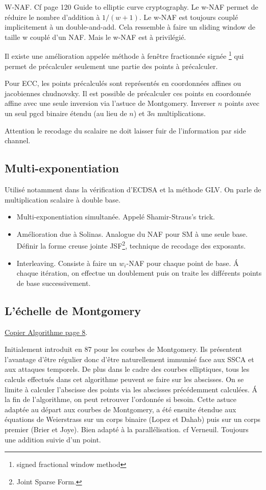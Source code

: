 W-NAF. Cf page 120 Guide to elliptic curve cryptography. Le w-NAF permet de réduire le nombre d'addition à $1/(w+1)$. Le w-NAF est toujours couplé implicitement à un double-and-add. Cela ressemble à faire un sliding window de taille w couplé d'un NAF. Mais le w-NAF est à privilégié.

Il existe une amélioration appelée méthode à fenêtre fractionnée signée \footnote{signed fractional window method} qui permet de précalculer seulement une partie des points à précalculer.

Pour ECC, les points précalculés sont représentés en coordonnées affines ou jacobiennes chudnovsky. Il est possible de précalculer ces points en coordonnée affine avec une seule inversion via l'astuce de Montgomery. Inverser $n$ points avec un seul pgcd binaire étendu (au lieu de $n$) et $3n$ multiplications.

Attention le recodage du scalaire ne doit laisser fuir de l'information par side channel.

\subsection{Multi-exponentiation}
Utilisé notamment dans la vérification d'ECDSA et la méthode GLV. On parle de multiplication scalaire à double base. 
\begin{itemize}[label=--]
    \item Multi-exponentiation simultanée. Appelé Shamir-Straus's trick.
    \item Amélioration due à Solinas. Analogue du NAF pour SM à une seule base. Définir la forme creuse jointe JSF\footnote{Joint Sparse Form.}, technique de recodage des exposants.
    \item Interleaving. Consiste à faire un $w_i$-NAF pour chaque point de base. \'A chaque itération, on effectue un doublement puis on traite les différents points de base successivement. 
\end{itemize}


\subsection{L'échelle de Montgomery}
\href{http://www.cs.ru.nl/bachelorscripties/2014/Wesley_Janssen___4037332___Curve25519_in_18_tweets.pdf}{Copier Algorithme page 8}.

Initialement introduit en 87 pour les courbes de Montgomery. Ils présentent l'avantage d'être régulier donc d'être naturellement immunisé face aux SSCA et aux attaques temporels. De plus dans le cadre des courbes elliptiques, tous les calculs effectués dans cet algorithme peuvent se faire sur les abscisses. On se limite à calculer l'abscisse des points via les abscisses précédemment calculées. \'A la fin de l'algorithme, on peut retrouver l'ordonnée si besoin. Cette astuce adaptée au départ aux courbes de Montgomery, a été ensuite étendue aux équations de Weierstrass sur un corps binaire (Lopez et Dahab) puis sur un corps premier (Brier et Joye). Bien adapté à la parallélisation. cf Verneuil. Toujours une addition suivie d'un point.

